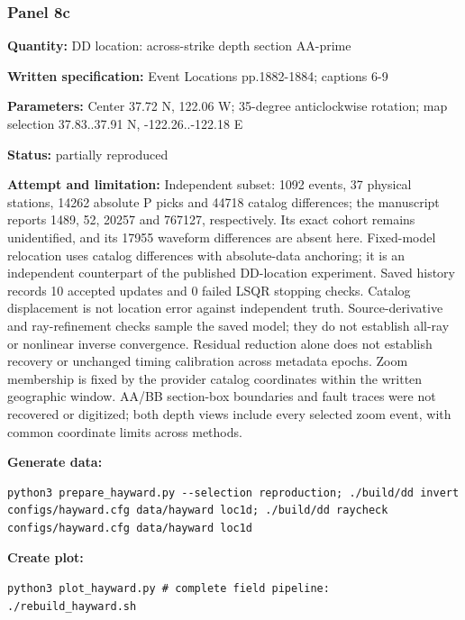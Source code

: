 \subsubsection*{Panel 8c}
\noindent\textbf{Quantity:} DD location: across-strike depth section AA-prime\par
\noindent\textbf{Written specification:} Event Locations pp.1882-1884; captions 6-9\par
\noindent\textbf{Parameters:} Center 37.72 N, 122.06 W; 35-degree anticlockwise rotation; map selection 37.83..37.91 N, -122.26..-122.18 E\par
\noindent\textbf{Status:} partially reproduced\par
\noindent\textbf{Attempt and limitation:} Independent subset: 1092 events, 37 physical stations, 14262 absolute P picks and 44718 catalog differences; the manuscript reports 1489, 52, 20257 and 767127, respectively. Its exact cohort remains unidentified, and its 17955 waveform differences are absent here. Fixed-model relocation uses catalog differences with absolute-data anchoring; it is an independent counterpart of the published DD-location experiment. Saved history records 10 accepted updates and 0 failed LSQR stopping checks. Catalog displacement is not location error against independent truth. Source-derivative and ray-refinement checks sample the saved model; they do not establish all-ray or nonlinear inverse convergence. Residual reduction alone does not establish recovery or unchanged timing calibration across metadata epochs. Zoom membership is fixed by the provider catalog coordinates within the written geographic window. AA/BB section-box boundaries and fault traces were not recovered or digitized; both depth views include every selected zoom event, with common coordinate limits across methods.\par
\noindent\textbf{Generate data:}
\begin{lstlisting}
python3 prepare_hayward.py --selection reproduction; ./build/dd invert configs/hayward.cfg data/hayward loc1d; ./build/dd raycheck configs/hayward.cfg data/hayward loc1d
\end{lstlisting}
\noindent\textbf{Create plot:}
\begin{lstlisting}
python3 plot_hayward.py # complete field pipeline: ./rebuild_hayward.sh
\end{lstlisting}
